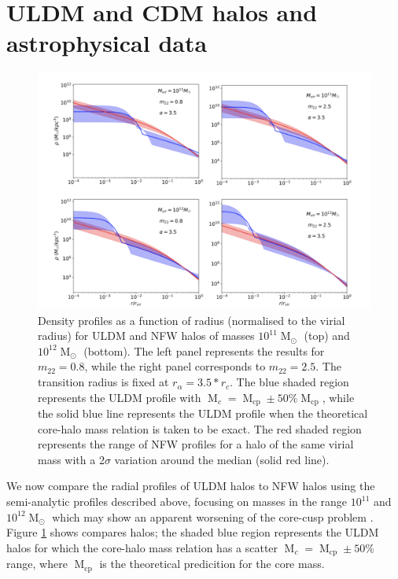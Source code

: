 \documentclass{pasa}%
\begin{document}
\section{ULDM and CDM halos and astrophysical data}\label{sec:velocity}

\begin{figure}[t]
\centering
\includegraphics[scale=0.4, trim={2cm 0cm 0cm 1cm}]{new_combined_1.png}
\caption{Density profiles as a function of radius (normalised to the virial radius) for ULDM and NFW halos of masses $10^{11}\operatorname{M}_{\odot}$ (top) and $10^{12}\operatorname{M}_{\odot}$ (bottom). The left panel represents the results for $m_{22} = 0.8$, while the right panel corresponds to $m_{22}=2.5$. The transition radius is fixed at $r_{\alpha} = 3.5*r_c$. The blue shaded region represents the ULDM profile with $\operatorname{M}_c = \operatorname{M}_{\mathrm{cp}} \pm 50 \% \operatorname{M}_{\mathrm{cp}}$, while the solid blue line represents the ULDM profile when the theoretical core-halo mass relation is taken to be exact. The red shaded region represents the range of NFW profiles for a halo of the same virial mass with a 2$\sigma$ variation around the median (solid red line).}\label{fig:profiles}
\end{figure}
 
We now compare the radial profiles of ULDM halos to NFW halos using the semi-analytic profiles described above, focusing on masses in the range $10^{11}$ and $10^{12} \operatorname{M}_{\odot}$ which may show an apparent worsening of the core-cusp problem \cite{Robles:2018fur}. Figure \ref{fig:profiles} shows compares halos; the shaded blue region represents the ULDM halos for which the core-halo mass relation has a scatter $\operatorname{M}_c = \operatorname{M}_{\mathrm{cp}} \pm 50 \% $ range, where $\operatorname{M}_{\mathrm{cp}}$ is the theoretical predicition for the core mass.
\end{document}
